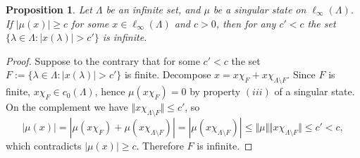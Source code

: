 \documentclass[12pt]{article}
\newtheorem{proposition}[theorem]{Proposition}
\begin{document}
\begin{proposition}\label{LInftyStateByMeanProps} Let $\Lambda$ be an infinite 
    set, and $\mu$ be a singular state on $\ell_\infty(\Lambda)$. 
    If $|\mu(x)|\geq c$ for 
    some $x\in\ell_\infty(\Lambda)$ and $c>0$, then for any $c'<c$ the 
    set $\{\lambda\in\Lambda: |x(\lambda)|>c'\}$ is infinite.
\end{proposition}
\begin{proof} Suppose to the contrary that for some $c'<c$ the 
    set $F:=\{\lambda\in\Lambda: |x(\lambda)|>c'\}$ is finite. Decompose 
    $x=x\chi_F+x\chi_{\Lambda\setminus F}$. Since $F$ is finite, 
    $x\chi_F\in c_0(\Lambda)$, hence $\mu(x\chi_F)=0$ by property $(iii)$ of a 
    singular state. On the complement we 
    have $\Vert x\chi_{\Lambda\setminus F}\Vert\leq c'$, so 
    \[
        |\mu(x)|
        =|\mu(x\chi_F)+\mu(x\chi_{\Lambda\setminus F})|
        =|\mu(x\chi_{\Lambda\setminus F})|
        \leq\Vert\mu\Vert\Vert x\chi_{\Lambda\setminus F}\Vert
        \leq c' < c,
    \]
    which contradicts $|\mu(x)|\geq c$. Therefore $F$ is infinite.
\end{proof}
\end{document}
